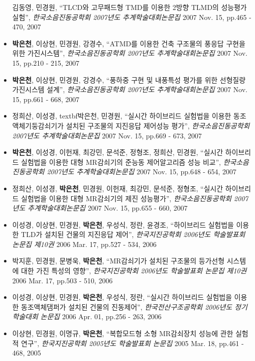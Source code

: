 \begin{itemize}
  김동영, 민경원, ``TLCD와 고무패드형 TMD를 이용한 2방향 TLMD의
  성능평가실험'', \emph{한국소음진동공학회 2007년도 추계학술대회논문집}
  2007 Nov. 15, pp.465 - 470, 2007
\item[]
  \textbf{박은천}, 이상현, 민경원, 강경수, ``ATMD를 이용한 건축 구조물의
  풍응답 구현을 위한 가진시스템'', \emph{한국소음진동공학회 2007년도
  추계학술대회논문집} 2007 Nov. 15, pp.210 - 215, 2007
\item[]
  \textbf{박은천}, 이상현, 민경원, 강경수, ``풍하중 구현 및 내풍특성
  평가를 위한 선형질량 가진시스템 설계'', \emph{한국소음진동공학회
  2007년도 추계학술대회논문집} 2007 Nov. 15, pp.661 - 668, 2007
\item[]
  정희산, 이성경, textbf{박은천}, 민경원, ``실시간 하이브리드 실험법을
  이용한 동조액체기둥감쇠기가 설치된 구조물의 지진응답 제어성능 평가'',
  \emph{한국소음진동공학회 2007년도 추계학술대회논문집} 2007 Nov. 15,
  pp.669 - 673, 2007
\item[]
  \textbf{박은천}, 이성경, 이헌재, 최강민, 문석준, 정형조, 정희산,
  민경원, ``실시간 하이브리드 실험법을 이용한 대형 MR감쇠기의 준능동
  제어알고리즘 성능 비교'', \emph{한국소음진동공학회 2007년도
  추계학술대회논문집} 2007 Nov. 15, pp.648 - 654, 2007
\item[]
  정희산, 이성경, \textbf{박은천}, 민경원, 이헌재, 최강민, 문석준,
  정형조, ``실시간 하이브리드 실험법을 이용한 대형 MR감쇠기의 제진
  성능평가'', \emph{한국소음진동공학회 2007년도 추계학술대회논문집} 2007
  Nov. 15, pp.655 - 660, 2007
\item[]
  이성경, 이상현, 민경원, \textbf{박은천}, 우성식, 정란, 윤경조,
  ``하이브리드 실험법을 이용한 TLD가 설치된 건물의 지진응답 제어'',
  \emph{한국지진공학회 2006년도 학술발표회 논문집 제10권} 2006 Mar. 17,
  pp.527 - 534, 2006
\item[]
  박지훈, 민경원, 문병욱, \textbf{박은천}, ``MR감쇠기가 설치된 구조물의
  등가선형 시스템에 대한 가진 특성의 영향'', \emph{한국지진공학회
  2006년도 학술발표회 논문집 제10권} 2006 Mar. 17, pp.503 - 510, 2006
\item[]
  이성경, 이상현, 민경원, \textbf{박은천}, 우성식, 정란, ``실시간
  하이브리드 실험법을 이용한 동조액체댐퍼가 설치된 건물의 진동제어'',
  \emph{한국전산구조공학회 2006년도 정기 학술대회 논문집} 2006 Apr. 01,
  pp.256 - 263, 2006
\item[]
  이상현, 민경원, 이명규, \textbf{박은천}, ``복합모드형 소형 MR감쇠장치
  성능에 관한 실험적 연구'', \emph{한국지진공학회 2005년도 학술발표회
  논문집} 2005 Mar. 18, pp.461 - 468, 2005
\end{itemize}

